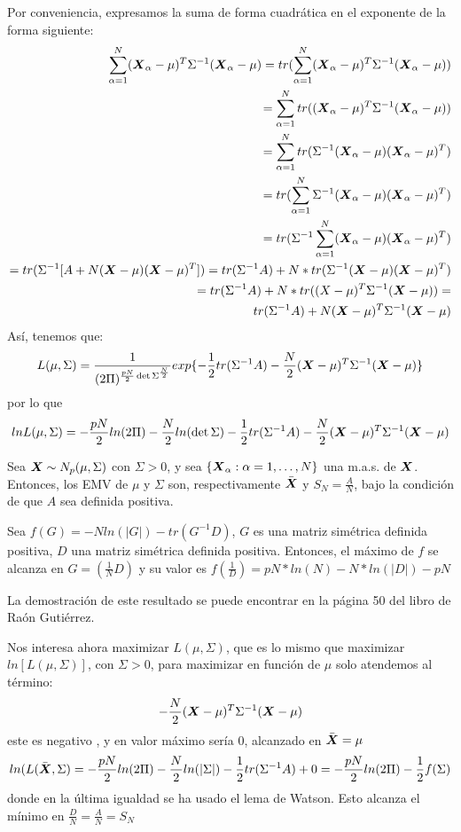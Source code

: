 Por conveniencia, expresamos la suma de forma cuadrática en el exponente de la forma siguiente:
$$
\begin{aligned}
\sum_{\alpha = 1}^N (\boldsymbol{X}_\alpha - \mu)^T \Sigma^{-1}(\boldsymbol{X}_\alpha - \mu) = tr(\sum_{\alpha = 1}^N (\boldsymbol{X}_\alpha - \mu)^T \Sigma^{-1}(\boldsymbol{X}_\alpha - \mu)) \\
= \sum_{\alpha = 1}^N tr((\boldsymbol{X}_\alpha - \mu)^T \Sigma^{-1}(\boldsymbol{X}_\alpha - \mu)) \\
= \sum_{\alpha = 1}^N tr(\Sigma^{-1}(\boldsymbol{X}_\alpha - \mu) (\boldsymbol{X}_\alpha - \mu)^T) \\
= tr(\sum_{\alpha = 1}^N \Sigma^{-1}(\boldsymbol{X}_\alpha - \mu) (\boldsymbol{X}_\alpha - \mu)^T) \\
= tr(\Sigma^{-1}\sum_{\alpha = 1}^N (\boldsymbol{X}_\alpha - \mu) (\boldsymbol{X}_\alpha - \mu)^T) \\
= tr(\Sigma^{-1}[A+N(\boldsymbol{X} - \mu)(\boldsymbol{X} - \mu)^T]) = tr(\Sigma^{-1}A) + N*tr(\Sigma^{-1}(\boldsymbol{X} - \mu)(\boldsymbol{X} - \mu)^T) \\ 
= tr(\Sigma^{-1}A) + N*tr((X-\mu)^T \Sigma^{-1}(\boldsymbol{X} - \mu)) = \\
tr(\Sigma^{-1}A) + N(\boldsymbol{X} - \mu)^T \Sigma^{-1}(\boldsymbol{X} - \mu)
\end{aligned}
$$
Así, tenemos que:
\[
L(\mu,\Sigma) = \frac{1}{(2\Pi)^{\frac{pN}{2}\det{\Sigma}^{\frac{N}{2}}}}exp\{-\frac{1}{2} tr(\Sigma^{-1}A) - \frac{N}{2}(\boldsymbol{X} - \mu)^T \Sigma^{-1}(\boldsymbol{X} - \mu)\}
\]
por lo que
\[
ln L(\mu,\Sigma) = -\frac{pN}{2}ln(2\Pi) - \frac{N}{2}ln(\det{\Sigma}) - \frac{1}{2}tr(\Sigma^{-1}A) - \frac{N}{2}(\boldsymbol{X} - \mu)^T\Sigma^{-1}(\boldsymbol{X} - \mu)
\]

\begin{nprop}
Sea $\boldsymbol{X} \sim N_p(\mu,\Sigma)$ con $\Sigma > 0$, y sea $\{\boldsymbol{X}_{\alpha} : \alpha = 1,\dots, N\}$ una m.a.s. de $\boldsymbol{X}$. Entonces, los EMV de $\mu$ y $\Sigma$ son, respectivamente $\bar{\boldsymbol{X}}$ y $S_N = \frac{A}{N}$, bajo la condición de que $A$ sea definida positiva.
\end{nprop}


\begin{lema}[Watson]
  Sea $f(G) = -N ln(|G|) - tr(G^{-1}D)$, $G$ es una matriz simétrica definida positiva, $D$ una matriz simétrica definida positiva. Entonces, el máximo de $f$ se alcanza en $G = (\frac{1}{N}D)$ y su valor es $f(\frac{1}{D}) = pN*ln(N) - N*ln(|D|) - pN$
\end{lema}
La demostración de este resultado se puede encontrar en la página 50 del libro de Raón Gutiérrez.

Nos interesa ahora maximizar $L(\mu,\Sigma)$, que es lo mismo que maximizar $ln[L(\mu,\Sigma)]$, con $\Sigma > 0$, para maximizar en función de $\mu$ solo atendemos al término:
\[
-\frac{N}{2}(\boldsymbol{X} - \mu)^T \Sigma^{-1}(\boldsymbol{X} - \mu)
\]
este es negativo , y en valor máximo sería 0, alcanzado en $\bar{\boldsymbol{X}} = \mu$
\[
ln(L(\bar{\boldsymbol{X}},\Sigma) = -\frac{pN}{2} ln(2\Pi) - \frac{N}{2}ln(|\Sigma|) - \frac{1}{2}tr(\Sigma^{-1}A) + 0 = -\frac{pN}{2}ln(2\Pi) - \frac{1}{2}f(\Sigma)
\]
donde en la última igualdad se ha usado el lema de Watson. Esto alcanza el mínimo en $\frac{D}{N} = \frac{A}{N} = S_N$\\

